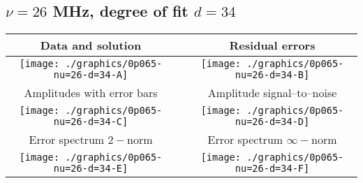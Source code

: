 

% 

\clearpage{}
\break{}

\subsection{$\nu = 26$ MHz, degree of fit $d = 34$}

\begin{table}[h]
    \begin{center}
        \begin{tabular}{ccc}
            Data and solution & \quad & Residual errors \\\hline
            \texttt{[image: ./graphics/0p065-nu=26-d=34-A]} &&
            \texttt{[image: ./graphics/0p065-nu=26-d=34-B]} \\[15pt]
            Amplitudes with error bars && Amplitude signal--to--noise \\\hline
            \texttt{[image: ./graphics/0p065-nu=26-d=34-C]} &&
            \texttt{[image: ./graphics/0p065-nu=26-d=34-D]} \\[15pt]
            Error spectrum $2-$norm && Error spectrum $\infty-$norm \\\hline
            \texttt{[image: ./graphics/0p065-nu=26-d=34-E]} &&
            \texttt{[image: ./graphics/0p065-nu=26-d=34-F]} \\[15pt]
        \end{tabular}
    \end{center}
\label{fig:elev=65, nu=26}
\end{table}



\endinput

